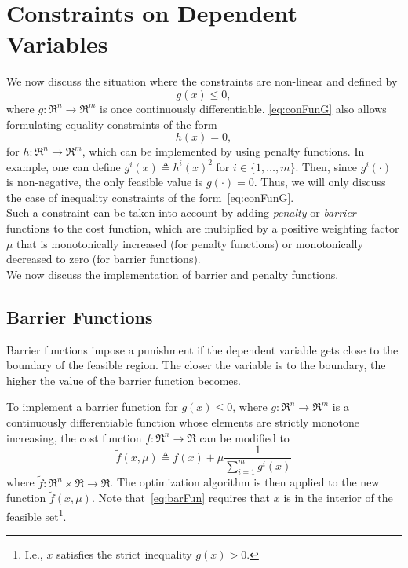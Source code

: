 
\section{Constraints on Dependent Variables}
\label{sec:conDepVarGen}
We now discuss the situation where the constraints are non-linear and 
defined by
\begin{equation}
   g(x) \le 0,
\label{eq:conFunG}
\end{equation}
where $g \colon \Re^n \rightarrow \Re^m$ is once continuously differentiable.
\eqref{eq:conFunG} also allows formulating equality constraints of the form
\begin{equation}
  h(x) = 0,
\label{eq:equCon}
\end{equation}
for $h \colon \Re^n \to \Re^m$, which can be implemented by using penalty functions.
In example, one can define $g^i(x) \triangleq h^i(x)^2$ for $i \in \{ 1, \ldots, m \}$. Then, since $g^i(\cdot)$ is non-negative, the only feasible value is $g(\cdot) = 0$.
Thus, we will only discuss the case of inequality constraints of the form~\eqref{eq:conFunG}.\\

Such a constraint can be taken into account by adding \emph{penalty} or \emph{barrier} functions to the cost function, which are multiplied by a positive weighting factor $\mu$
that is monotonically increased (for penalty functions) or monotonically decreased to zero (for barrier functions).\\

We now discuss the implementation of barrier and penalty functions.
\subsection{Barrier Functions}
Barrier functions impose a punishment if the dependent variable gets close to the 
boundary of the feasible region.
The closer the variable is to the boundary, 
the higher the value of the barrier function becomes.

\noindent To implement a barrier function for $g(x) \le 0$,
where $g \colon \Re^n \to \Re^m$ is a continuously differentiable function whose
elements are strictly monotone increasing,
the cost function $f \colon \Re^n \to \Re$ can
be modified to
\begin{equation}
\widetilde f(x, \mu) \triangleq f(x) + \mu  \frac{1}{\sum_{i=1}^m g^i(x)}
\label{eq:barFun}
\end{equation}
where $\widetilde f \colon \Re^n \times \Re \to \Re$.
The optimization algorithm is then applied to the new function $\widetilde f(x,\mu)$.
Note that~\eqref{eq:barFun} requires that $x$ is in the interior of the feasible set\footnote{I.e., $x$ satisfies the strict inequality $g(x) > 0$.}.


